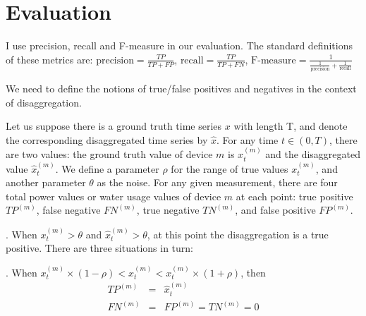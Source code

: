 \section{Evaluation}
%
%
I use precision, recall and F-measure in our evaluation. The standard
definitions of these metrics are:
$\textrm{precision}=\frac{TP}{TP+FP}$, 
$\textrm{recall}=\frac{TP}{TP+FN}$,
$\textrm{F-measure}=\frac{1}{\frac{1}{\textrm{precision}}+\frac{1}{\textrm{recall}}}$

We need to define the notions of true/false positives
and negatives in the context of disaggregation.

Let us suppose there is a ground truth time series $x$ with length T, 
and denote the corresponding disaggregated time series by $\hat{x}$.
For any time $t \in (0, T)$, there are two values: the
ground truth value of device $m$ is $x_t^{(m)}$ and the disaggregated value
$\hat{x}_t^{(m)}$. We define a parameter $\rho$ for the range of
true values $x_t^{(m)}$, and another parameter $\theta$
as the noise.
For any given measurement, 
there are four total power values or water usage values of device $m$ at
each point: true positive $TP^{(m)}$,  false negative $FN^{(m)}$,
true negative $TN^{(m)}$, and false positive $FP^{(m)}$.

. When $x_t^{(m)} > \theta$ and  $\hat{x}_t^{(m)}> \theta  $,
at this point the disaggregation is a true positive.
There are three situations in turn:

. When $  x_t^{(m)} \times (1-\rho) <  \hat{x}_t^{(m)} <  x_t^{(m)} \times (1+\rho)  $, then
\begin{eqnarray*}
 TP^{(m)} &=& \hat{x}_t^{(m)} \\
 FN^{(m)}&=&FP^{(m)} = TN^{(m)}=0
\end{eqnarray*}


